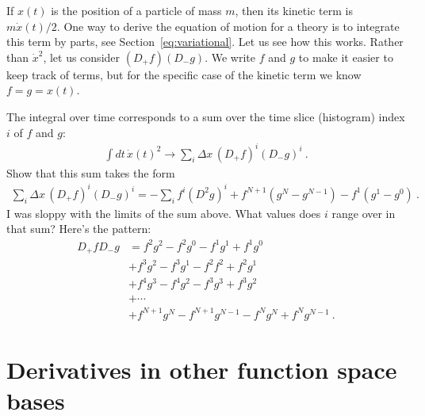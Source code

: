 \begin{exercise} \label{ex:integrate:kinetic:term:by:parts}
If $x(t)$ is the position of a particle of mass $m$, then its kinetic term is $m\dot x(t)/2$. One way to derive the equation of motion for a theory is to integrate this term by parts, see Section~\ref{eq:variational}. Let us see how this works. Rather than $\dot x^2$, let us consider $(D_+f)(D_-g)$. We write $f$ and $g$ to make it easier to keep track of terms, but for the specific case of the kinetic term we know $f=g=x(t)$. 

The integral over time corresponds to a sum over the time slice (histogram) index $i$ of $f$ and $g$:
\begin{align}
    \int dt\, \dot x(t)^2 \to \sum_i \Delta x \, (D_+f)^i(D_-g)^i \ .
\end{align}
Show that this sum takes the form
\begin{align}
    \sum_i \Delta x \, (D_+f)^i(D_-g)^i 
    = -\sum_i f^i (D^2 g)^i 
    + f^{N+1}(g^N-g^{N-1})
    - f^1(g^1 - g^0) \ .
\end{align}
I was sloppy with the limits of the sum above. What values does $i$ range over in that sum?
Here's the pattern:
\begin{align}
    D_+fD_-g &= 
    f^2g^2 - f^2g^0 - f^1 g^1 + f^1 g^0\\
    &+ f^3 g^2 - f^3 g^1 - f^2 f^2 + f^2 g^1 \\
    &+ f^4 g^3 - f^4 g^2 - f^3 g^3 + f^3 g^2 \\
    &+ \cdots \\
    & + f^{N+1} g^N - f^{N+1} g^{N-1} - f^N g^N + f^N g^{N-1}  \ .
\end{align}
\end{exercise}

\section{Derivatives in other function space bases}
\label{sec:derivatives}


